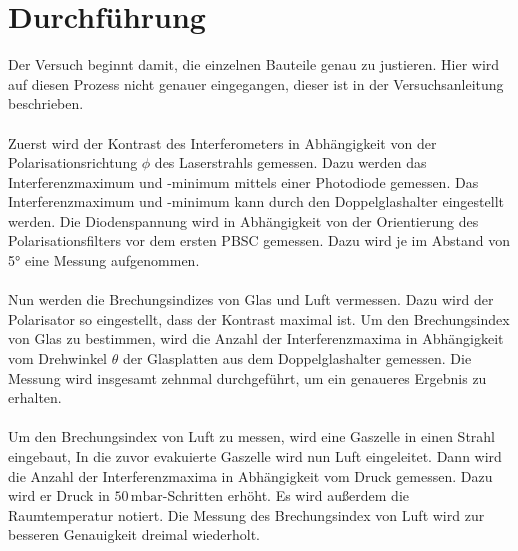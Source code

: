 \section{Durchführung}
\label{sec:Durchführung}
Der Versuch beginnt damit, die einzelnen Bauteile genau zu justieren. Hier wird auf diesen Prozess nicht genauer eingegangen, dieser ist in der Versuchsanleitung
\cite{ap64} beschrieben. \\
\\
Zuerst wird der Kontrast des Interferometers in Abhängigkeit von der Polarisationsrichtung $\phi$ des Laserstrahls gemessen. Dazu werden das Interferenzmaximum und -minimum
mittels einer Photodiode gemessen. Das Interferenzmaximum und -minimum kann durch den Doppelglashalter eingestellt werden.
Die Diodenspannung wird in Abhängigkeit von der Orientierung des Polarisationsfilters vor dem ersten PBSC gemessen. Dazu wird je im Abstand von 5° eine Messung aufgenommen.
\\
\\
Nun werden die Brechungsindizes von Glas und Luft vermessen. Dazu wird der Polarisator so eingestellt, dass der Kontrast maximal ist. 
Um den Brechungsindex von Glas zu bestimmen, wird die Anzahl der Interferenzmaxima in Abhängigkeit vom Drehwinkel 
$\theta$ der Glasplatten aus dem Doppelglashalter gemessen. Die Messung wird insgesamt zehnmal durchgeführt, um ein genaueres Ergebnis zu erhalten. \\
\\
Um den Brechungsindex von Luft zu messen, wird eine Gaszelle in einen Strahl eingebaut, 
In die zuvor evakuierte Gaszelle wird nun Luft eingeleitet. Dann wird die Anzahl der Interferenzmaxima in 
Abhängigkeit vom Druck gemessen. Dazu wird er Druck in $50\,\mathrm{mbar}$-Schritten erhöht. Es wird außerdem die Raumtemperatur notiert. Die Messung des Brechungsindex 
von Luft wird zur besseren Genauigkeit dreimal wiederholt.